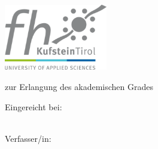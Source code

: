 \thispagestyle{empty}
\begin{titlepage}

 \condTWOSIDE{\changetext{}{19mm}{}{19mm}{}}

 \vspace{1cm}
 \begin{center}
  \hfill\includegraphics[width=4.5cm]{gfx/logo_fh-kufstein} \\ 
 \end{center}
 \vfill

 \begin{center}
  \LARGE \textbf{\myTitle}
 \end{center} 
 \vfill

 \begin{center}
 \end{center}
 \vfill

 \begin{center}
  \Large{zur Erlangung des akademischen Grades}
 \end{center}
 \vfill

 \begin{center}
  \LARGE \textbf{\myDegree}
 \end{center}
 \vfill

 \begin{center}
  \large Eingereicht bei:\\ 
  \vspace{0.1cm}
  \large \textbf{\myUni}\\
  \vspace{0.1cm}
  \large \textbf{\myFaculty}
 \end{center}
 \vfill

 \begin{center}
  \large Verfasser/in:\\
  \vspace{0.1cm}
  \large \textbf{\myName}\\
  \vspace{0.1cm}
  \large \textbf{\myId}\\
 \end{center}
 \vfill


\end{titlepage}

